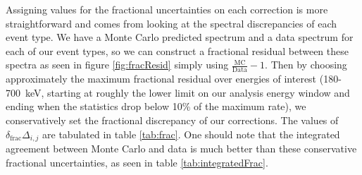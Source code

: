 Assigning values for the fractional uncertainties on each correction is more straightforward
and comes from looking at the spectral discrepancies of each event type. We have a Monte
Carlo predicted spectrum and a data spectrum for each of our event types, so we can construct
a fractional residual between these spectra as seen in figure \ref{fig:fracResid} simply using
$\frac{\mathrm{MC}}{\mathrm{Data}}-1$. Then by choosing approximately
the maximum fractional residual over energies of interest (180-700~keV, starting at roughly the lower
limit on our analysis energy window and ending when the statistics drop below 10\% of the maximum rate),
we conservatively set the fractional discrepancy of our corrections. The values of 
$\delta_{\mathrm{frac}}\Delta_{i,j}$ are tabulated in table \ref{tab:frac}.
One should note
that the integrated agreement between Monte Carlo and data is much better than these
conservative fractional uncertainties, as seen in table \ref{tab:integratedFrac}.

